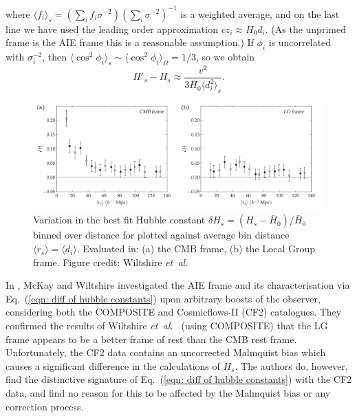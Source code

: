 \documentclass[a4paper,12pt]{report}
\newcommand{\etal}{\emph{et~al.\ }}
\renewcommand{\eqref}[1]{Eq.~({#1})}
\begin{document}
where $\langle f_i \rangle_s = \left(\sum_i f_i \sigma^{-2} \right)\left(\sum_i \sigma^{-2} \right)^{-1}$ is a weighted average, and on the last line we have used the leading order approximation $cz_i \approx H_0 d_i$. (As the unprimed frame is the AIE frame this is a reasonable assumption.)
If $\phi_i$ is uncorrelated with $\sigma_i^{-2}$, then $\langle \cos^2\phi_i \rangle_s \sim \langle \cos^2\phi_i \rangle_\Omega = 1/3$, so we obtain
\begin{equation}\label{eqn: diff of hubble constants}
  H'_s - H_s \approx \frac{v^2}{3\bar{H}_0 \langle d_i^2 \rangle_s}.
\end{equation}

\begin{figure}[t]
  \centering
  \includegraphics[width=\textwidth]{Spherically averaged Hubble constant variation Wiltshire et al 2013.png}
  \caption{Variation in the best fit Hubble constant $\delta H_s = (H_s - \bar{H}_0)/\bar{H}_0$ binned over distance for plotted against average bin distance $\langle r_s \rangle = \langle d_i \rangle$. Evaluated in: (a) the CMB frame, (b) the Local Group frame. Figure credit: Wiltshire \etal \cite{RN35}}
  \label{fig: Hubble flow variance - CMB vs LG}
\end{figure}

In \cite{RN40}, McKay and Wiltshire investigated the AIE frame and its characterisation via \eqref{\ref{eqn: diff of hubble constants}} upon arbitrary boosts of the observer, considering both the COMPOSITE and Cosmicflows-II (CF2) catalogues. They confirmed the results of Wiltshire \etal \cite{RN35} (using COMPOSITE) that the LG frame appears to be a better frame of rest than the CMB rest frame. Unfortunately, the CF2 data contains an uncorrected Malmquist bias which causes a significant difference in the calculations of $H_s$. The authors do, however, find the distinctive signature of \eqref{\ref{eqn: diff of hubble constants}} with the CF2 data, and find no reason for this to be affected by the Malmquist bias or any correction process.
\end{document}
